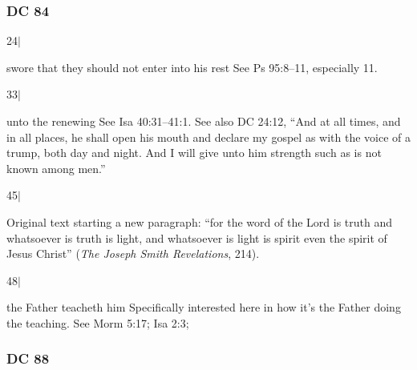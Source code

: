 	\subsubsection{DC 84} %
	
		\begin{compactdesc}
		
		\item[24$\vert$]
		\begin{compactdesc}
		\item[swore that they should not enter into his rest] See Ps 95:8--11, especially 11.
		\end{compactdesc}
		
		\item[33$\vert$]
		\begin{compactdesc}
		\item[unto the renewing] See Isa 40:31--41:1.
			See also DC 24:12, ``And at all times, and in all places, he shall open his mouth and declare my gospel as with the voice of a trump, both day and night. And I will give unto him strength such as is not known among men.''
		\end{compactdesc}
		
		\item[45$\vert$]
		\begin{compactdesc}
		\item[Original text] starting a new paragraph: ``for the word of the Lord is truth and whatsoever is truth is light, and whatsoever is light is spirit even the spirit of Jesus Christ'' (\textit{The Joseph Smith Revelations}, 214).
		\end{compactdesc}
		
		\item[48$\vert$]
		\begin{compactdesc}
		\item[the Father teacheth him] Specifically interested here in how it's the Father doing the teaching. See Morm 5:17; Isa 2:3; 
		\end{compactdesc}
		
		\end{compactdesc} 

	\subsubsection{DC 88} %
	
